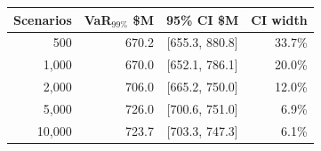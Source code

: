 \begin{tabular}{rrcr}
\toprule
Scenarios & VaR$_{99\%}$ \$M & 95\% CI \$M & CI width \\
\midrule
500 & 670.2 & [655.3, 880.8] & 33.7\% \\
1,000 & 670.0 & [652.1, 786.1] & 20.0\% \\
2,000 & 706.0 & [665.2, 750.0] & 12.0\% \\
5,000 & 726.0 & [700.6, 751.0] & 6.9\% \\
10,000 & 723.7 & [703.3, 747.3] & 6.1\% \\
\bottomrule
\end{tabular}
